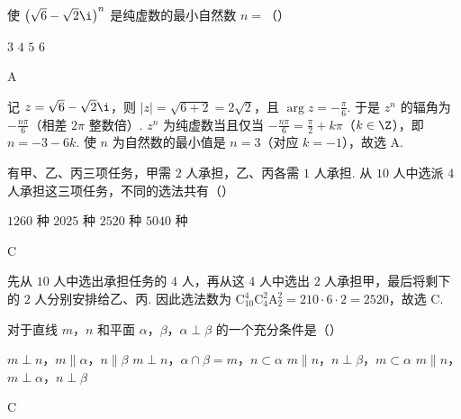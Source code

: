 \begin{problem}
使 \(\left(\sqrt{6} - \sqrt{2}\i\right)^n\) 是纯虚数的最小自然数 \(n =\)（\quad）

\choices
    {\(3\)}
    {\(4\)}
    {\(5\)}
    {\(6\)}
\end{problem}

\begin{answer}
A
\end{answer}

\begin{solution}
记 \(z = \sqrt{6} - \sqrt{2}\i\)，则 \(|z| = \sqrt{6 + 2} = 2\sqrt{2}\)，且 \(\arg z = -\frac{\pi}{6}\). 于是 \(z^n\) 的辐角为 \(-\frac{n\pi}{6}\)（相差 \(2\pi\) 整数倍）. \(z^n\) 为纯虚数当且仅当 \(-\frac{n\pi}{6} = \frac{\pi}{2} + k\pi\)（\(k \in \Z\)），即 \(n = -3 - 6k\). 使 \(n\) 为自然数的最小值是 \(n = 3\)（对应 \(k = -1\)），故选 A.
\end{solution}

\begin{problem}
有甲、乙、丙三项任务，甲需 \(2\) 人承担，乙、丙各需 \(1\) 人承担. 从 \(10\) 人中选派 \(4\) 人承担这三项任务，不同的选法共有（\quad）

\choices
    {\(1260\) 种}
    {\(2025\) 种}
    {\(2520\) 种}
    {\(5040\) 种}
\end{problem}

\begin{answer}
C
\end{answer}

\begin{solution}
先从 \(10\) 人中选出承担任务的 \(4\) 人，再从这 \(4\) 人中选出 \(2\) 人承担甲，最后将剩下的 \(2\) 人分别安排给乙、丙. 因此选法数为 \(\mathrm C_{10}^{4}\mathrm C_{4}^{2}\mathrm A_{2}^{2} = 210 \cdot 6 \cdot 2 = 2520\)，故选 C.
\end{solution}

\begin{problem}
对于直线 \(m\)，\(n\) 和平面 \(\alpha\)，\(\beta\)，\(\alpha \perp \beta\) 的一个充分条件是（\quad）

\choices
    {\(m \perp n\)，\(m \parallel \alpha\)，\(n \parallel \beta\)}
    {\(m \perp n\)，\(\alpha \cap \beta = m\)，\(n \subset \alpha\)}
    {\(m \parallel n\)，\(n \perp \beta\)，\(m \subset \alpha\)}
    {\(m \parallel n\)，\(m \perp \alpha\)，\(n \perp \beta\)}
\end{problem}

\begin{answer}
C
\end{answer}

